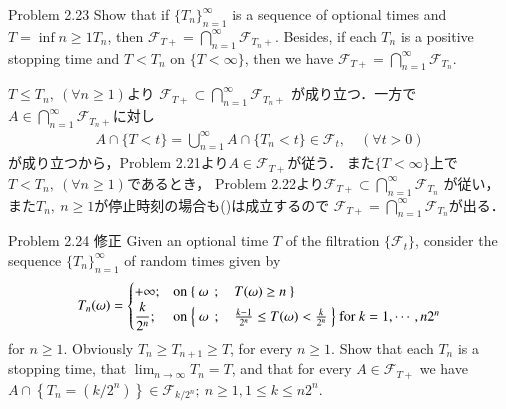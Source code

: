 	\begin{itembox}[l]{Problem 2.23}
		Show that if $\{T_n\}_{n=1}^\infty$ is a sequence of optional times
		and $T = \inf{n \geq 1}{T_n}$, then $\mathscr{F}_{T+} = \bigcap_{n=1}^\infty \mathscr{F}_{T_n+}$.
		Besides, if each $T_n$ is a positive stopping time and $T < T_n$ on
		$\{T < \infty\}$, then we have $\mathscr{F}_{T+} = \bigcap_{n=1}^\infty \mathscr{F}_{T_n}$.
	\end{itembox}
	
	\begin{prf}
		$T \leq T_n,\ (\forall n \geq 1)$より
		$\mathscr{F}_{T+} \subset \bigcap_{n=1}^\infty \mathscr{F}_{T_n+}$
		が成り立つ．一方で$A \in \bigcap_{n=1}^\infty \mathscr{F}_{T_n+}$に対し
		\begin{align}
			A \cap \{T < t\}
			= \bigcup_{n=1}^\infty A \cap \{T_n < t\}
			\in \mathscr{F}_t,
			\quad (\forall t > 0)
			\label{eq:chapter_1_problem_2_23}
		\end{align}
		が成り立つから，Problem 2.21より$A \in \mathscr{F}_{T+}$が従う．
		また$\{T < \infty\}$上で$T < T_n,\ (\forall n \geq 1)$であるとき，
		Problem 2.22より$\mathscr{F}_{T+} \subset \bigcap_{n=1}^\infty \mathscr{F}_{T_n}$
		が従い，また$T_n,\ n \geq 1$が停止時刻の場合も()は成立するので
		$\mathscr{F}_{T+} = \bigcap_{n=1}^\infty \mathscr{F}_{T_n}$が出る．
		\QED
	\end{prf}
	
	\begin{itembox}[l]{Problem 2.24 修正}\label{chapter_1_Problem_2_24}
		Given an optional time $T$ of the filtration $\{\mathscr{F}_t\}$,
		consider the sequence $\{T_n\}_{n=1}^\infty$ of random times given by
		\begin{align}
			T_n(\omega) = 
			\begin{cases}
				+\infty; & \mbox{on $\left\{\ \omega\ \, ; \quad T(\omega) \geq n\ \right\}$} \\
				\displaystyle\frac{k}{2^n}; & \mbox{on $\left\{\ \omega\ \, ; \quad \frac{k-1}{2^n} \leq T(\omega) < \frac{k}{2^n}\ \right\}$ for $k=1,\cdots,n2^n$}
			\end{cases}
		\end{align}
		for $n \geq 1$. Obviously $T_n \geq T_{n+1} \geq T$,
		for every $n \geq 1$. Show that each $T_n$ is a stopping time,
		that $\lim_{n \to \infty} T_n = T$, and that for every $A \in \mathscr{F}_{T+}$
		we have $A \cap \left\{ T_n = (k/2^n) \right\} \in \mathscr{F}_{k/2^n};\ n \geq 1, 1 \leq k \leq n2^n$.
	\end{itembox}
	
